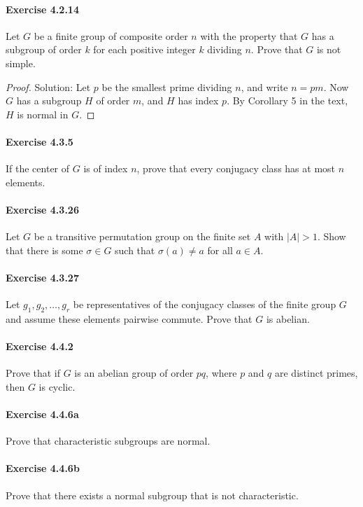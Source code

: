 \documentclass{article}
\theoremstyle{definition}
\begin{document}
\paragraph{Exercise 4.2.14} Let $G$ be a finite group of composite order $n$ with the property that $G$ has a subgroup of order $k$ for each positive integer $k$ dividing $n$. Prove that $G$ is not simple.
\begin{proof}
    Solution: Let $p$ be the smallest prime dividing $n$, and write $n=p m$. Now $G$ has a subgroup $H$ of order $m$, and $H$ has index $p$. By Corollary 5 in the text, $H$ is normal in $G$.
\end{proof}


\paragraph{Exercise 4.3.5} If the center of $G$ is of index $n$, prove that every conjugacy class has at most $n$ elements.

\paragraph{Exercise 4.3.26} Let $G$ be a transitive permutation group on the finite set $A$ with $|A|>1$. Show that there is some $\sigma \in G$ such that $\sigma(a) \neq a$ for all $a \in A$.

\paragraph{Exercise 4.3.27} Let $g_{1}, g_{2}, \ldots, g_{r}$ be representatives of the conjugacy classes of the finite group $G$ and assume these elements pairwise commute. Prove that $G$ is abelian.

\paragraph{Exercise 4.4.2} Prove that if $G$ is an abelian group of order $p q$, where $p$ and $q$ are distinct primes, then $G$ is cyclic.

\paragraph{Exercise 4.4.6a} Prove that characteristic subgroups are normal.

\paragraph{Exercise 4.4.6b} Prove that there exists a normal subgroup that is not characteristic.
\end{document}
